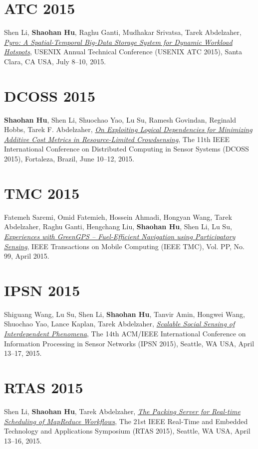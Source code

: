\section{\sc ATC 2015}\hypertarget{li2015atc}{} Shen Li, \textbf{Shaohan Hu}, Raghu Ganti, Mudhakar Srivatsa, Tarek Abdelzaher, \href{https://www.usenix.org/system/files/conference/atc15/atc15-paper-li-shen.pdf}{\emph{Pyro: A Spatial-Temporal Big-Data Storage System for Dynamic Workload Hotspots}}, \textsf{USENIX Annual Technical Conference (USENIX ATC 2015)}, Santa Clara, CA USA, July 8--10, 2015.

\section{\sc DCOSS 2015}\hypertarget{hu2015dcoss}{} \textbf{Shaohan Hu}, Shen Li, Shuochao Yao, Lu Su, Ramesh Govindan, Reginald Hobbs, Tarek F. Abdelzaher, \href{http://ieeexplore.ieee.org/xpl/articleDetails.jsp?arnumber=7165037}{\emph{On Exploiting Logical Dependencies for Minimizing Additive Cost Metrics in Resource-Limited Crowdsensing}}, \textsf{The 11th IEEE International Conference on Distributed Computing in Sensor Systems (DCOSS 2015)}, Fortaleza, Brazil, June 10--12, 2015.

\section{\sc TMC 2015}\hypertarget{saremi2015tmc}{} Fatemeh Saremi, Omid Fatemieh, Hossein Ahmadi, Hongyan Wang, Tarek Abdelzaher, Raghu Ganti, Hengchang Liu, \textbf{Shaohan Hu}, Shen Li, Lu Su, \href{http://ieeexplore.ieee.org/xpl/articleDetails.jsp?tp=&arnumber=7084108}{\emph{Experiences with GreenGPS -- Fuel-Efficient Navigation using Participatory Sensing}}, \textsf{IEEE Transactions on Mobile Computing (IEEE TMC)}, Vol. PP, No. 99, April 2015.

\section{\sc IPSN 2015}\hypertarget{wang2015ipsn}{} Shiguang Wang, Lu Su, Shen Li, \textbf{Shaohan Hu}, Tanvir Amin, Hongwei Wang, Shuochao Yao, Lance Kaplan, Tarek Abdelzaher, \href{http://dl.acm.org/citation.cfm?id=2737114}{\emph{Scalable Social Sensing of Interdependent Phenomena}}, \textsf{The 14th ACM/IEEE International Conference on Information Processing in Sensor Networks (IPSN 2015)}, Seattle, WA USA, April 13--17, 2015.

\section{\sc RTAS 2015}\hypertarget{li2015rtas}{} Shen Li, \textbf{Shaohan Hu}, Tarek Abdelzaher, \href{http://ieeexplore.ieee.org/xpl/articleDetails.jsp?tp=&arnumber=7108416}{\emph{The Packing Server for Real-time Scheduling of MapReduce Workflows}}, \textsf{The 21st IEEE Real-Time and Embedded Technology and Applications Symposium (RTAS 2015)}, Seattle, WA USA, April 13--16, 2015.

